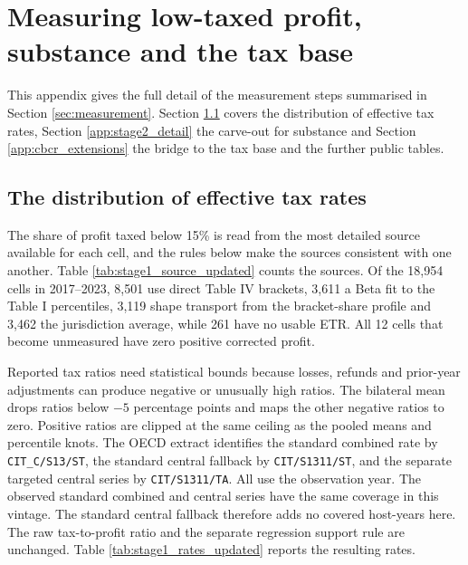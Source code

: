 \documentclass[11pt,a4paper]{article}
\begin{document}
\clearpage
\section{Measuring low-taxed profit, substance and the tax base}\label{app:measurement}

This appendix gives the full detail of the measurement steps summarised in Section \ref{sec:measurement}. Section \ref{app:stage1_detail} covers the distribution of effective tax rates, Section \ref{app:stage2_detail} the carve-out for substance and Section \ref{app:cbcr_extensions} the bridge to the tax base and the further public tables.

\subsection{The distribution of effective tax rates}\label{app:stage1_detail}

The share of profit taxed below 15\% is read from the most detailed source available for each cell, and the rules below make the sources consistent with one another. Table \ref{tab:stage1_source_updated} counts the sources. Of the 18,954 cells in 2017–2023, 8,501 use direct Table IV brackets, 3,611 a Beta fit to the Table I percentiles, 3,119 shape transport from the bracket-share profile and 3,462 the jurisdiction average, while 261 have no usable ETR. All 12 cells that become unmeasured have zero positive corrected profit.



Reported tax ratios need statistical bounds because losses, refunds and prior-year adjustments can produce negative or unusually high ratios. The bilateral mean drops ratios below $-5$ percentage points and maps the other negative ratios to zero. Positive ratios are clipped at the same ceiling as the pooled means and percentile knots. The OECD extract identifies the standard combined rate by \texttt{CIT\_C/S13/ST}, the standard central fallback by \texttt{CIT/S1311/ST}, and the separate targeted central series by \texttt{CIT/S1311/TA}. All use the observation year. The observed standard combined and central series have the same coverage in this vintage. The standard central fallback therefore adds no covered host-years here. The raw tax-to-profit ratio and the separate regression support rule are unchanged. Table \ref{tab:stage1_rates_updated} reports the resulting rates.


\end{document}
